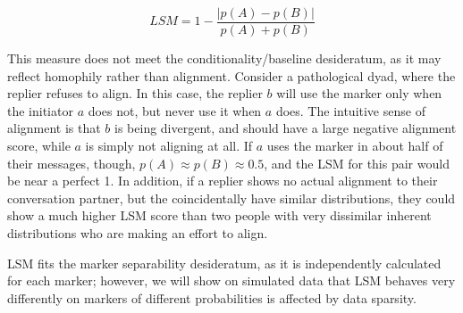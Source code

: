 \documentclass{acm_proc_article-sp}
\begin{document}
\begin{equation}
LSM = 1 - \frac{|p(A)-p(B)|}{p(A)+p(B)}
\end{equation}

This measure does not meet the conditionality/baseline desideratum, as it may reflect homophily rather than alignment.  Consider a pathological dyad, where the replier refuses to align.  In this case, the replier $b$ will use the marker only when the initiator $a$ does not, but never use it when $a$ does. The intuitive sense of alignment is that $b$ is being divergent, and should have a large negative alignment score, while $a$ is simply not aligning at all. If $a$ uses the marker in about half of their messages, though, $p(A) \approx p(B) \approx 0.5$, and the LSM for this pair would be near a perfect 1.  In addition, if a replier shows no actual alignment to their conversation partner, but the coincidentally have similar distributions, they could show a much higher LSM score than two people with very dissimilar inherent distributions who are making an effort to align. 

LSM fits the marker separability desideratum, as it is independently calculated for each marker; however, we will show on simulated data that LSM behaves very differently on markers of different probabilities is affected by data sparsity.





\end{document}

